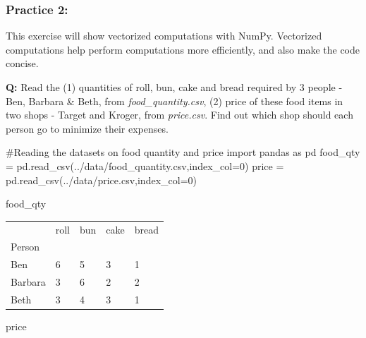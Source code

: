 \documentclass[
  letterpaper,
  DIV=11,
  numbers=noendperiod]{scrreprt}
\newenvironment{Shaded}{\begin{snugshade}}{\end{snugshade}}
\newcommand{\CommentTok}[1]{\textcolor[rgb]{0.37,0.37,0.37}{#1}}
\newcommand{\DecValTok}[1]{\textcolor[rgb]{0.68,0.00,0.00}{#1}}
\newcommand{\ImportTok}[1]{\textcolor[rgb]{0.00,0.46,0.62}{#1}}
\newcommand{\NormalTok}[1]{\textcolor[rgb]{0.00,0.23,0.31}{#1}}
\newcommand{\OperatorTok}[1]{\textcolor[rgb]{0.37,0.37,0.37}{#1}}
\newcommand{\StringTok}[1]{\textcolor[rgb]{0.13,0.47,0.30}{#1}}
\begin{document}
\hypertarget{practice-2}{%
\subsubsection{Practice 2:}\label{practice-2}}

This exercise will show vectorized computations with NumPy. Vectorized
computations help perform computations more efficiently, and also make
the code concise.

\textbf{Q:} Read the (1) quantities of roll, bun, cake and bread
required by 3 people - Ben, Barbara \& Beth, from
\emph{food\_quantity.csv}, (2) price of these food items in two shops -
Target and Kroger, from \emph{price.csv}. Find out which shop should
each person go to minimize their expenses.

\begin{Shaded}
\begin{Highlighting}[]
\CommentTok{\#Reading the datasets on food quantity and price}
\ImportTok{import}\NormalTok{ pandas }\ImportTok{as}\NormalTok{ pd}
\NormalTok{food\_qty }\OperatorTok{=}\NormalTok{ pd.read\_csv(}\StringTok{\textquotesingle{}../data/food\_quantity.csv\textquotesingle{}}\NormalTok{,index\_col}\OperatorTok{=}\DecValTok{0}\NormalTok{)}
\NormalTok{price }\OperatorTok{=}\NormalTok{ pd.read\_csv(}\StringTok{\textquotesingle{}../data/price.csv\textquotesingle{}}\NormalTok{,index\_col}\OperatorTok{=}\DecValTok{0}\NormalTok{)}
\end{Highlighting}
\end{Shaded}

\begin{Shaded}
\begin{Highlighting}[]
\NormalTok{food\_qty}
\end{Highlighting}
\end{Shaded}

\begin{longtable}[]{@{}lllll@{}}
\toprule\noalign{}
& roll & bun & cake & bread \\
Person & & & & \\
\midrule\noalign{}
\endhead
\bottomrule\noalign{}
\endlastfoot
Ben & 6 & 5 & 3 & 1 \\
Barbara & 3 & 6 & 2 & 2 \\
Beth & 3 & 4 & 3 & 1 \\
\end{longtable}

\begin{Shaded}
\begin{Highlighting}[]
\NormalTok{price}
\end{Highlighting}
\end{Shaded}
\end{document}
